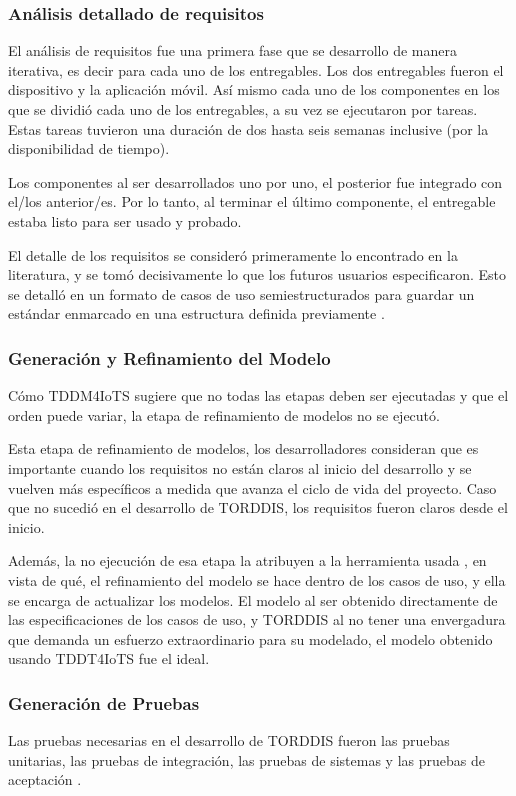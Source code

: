 \subsubsection{Análisis detallado de requisitos}
El análisis de requisitos fue una primera fase que se desarrollo de manera iterativa, es decir para cada uno de los entregables. Los dos entregables fueron el dispositivo y la aplicación móvil. Así mismo cada uno de los componentes en los que se dividió cada uno de los entregables, a su vez se ejecutaron por tareas. Estas tareas tuvieron una duración de dos hasta seis semanas inclusive (por la disponibilidad de tiempo).

Los componentes al ser desarrollados uno por uno, el posterior fue integrado con el/los anterior/es. Por lo tanto, al terminar el último componente, el entregable estaba listo para ser usado y probado.

El detalle de los requisitos se consideró primeramente lo encontrado en la literatura, y se tomó decisivamente lo que los futuros usuarios especificaron. Esto se detalló en un formato de casos de uso semiestructurados para guardar un estándar enmarcado en una estructura definida previamente \citep{Zegzhda2018Use}.

\subsubsection{Generación y Refinamiento del Modelo}
Cómo TDDM4IoTS \citep{Guerrero-Ulloa2020TDDM4IoTS} sugiere que no todas las etapas deben ser ejecutadas y que el orden puede variar, la etapa de refinamiento de modelos no se ejecutó.

Esta etapa de refinamiento de modelos, los desarrolladores consideran que es importante cuando los requisitos no están claros al inicio del desarrollo y se vuelven más específicos a medida que avanza el ciclo de vida del proyecto. Caso que no sucedió en el desarrollo de TORDDIS, los requisitos fueron claros desde el inicio.

Además, la no ejecución de esa etapa la atribuyen a la herramienta usada \citep{Guerrero2024Test}, en vista de qué, el refinamiento del modelo se hace dentro de los casos de uso, y ella se encarga de actualizar los modelos. El modelo al ser obtenido directamente de las especificaciones de los casos de uso, y TORDDIS al no tener una envergadura que demanda un esfuerzo extraordinario para su modelado, el modelo obtenido usando TDDT4IoTS fue el ideal.

\subsubsection{Generación de Pruebas}
Las pruebas necesarias en el desarrollo de TORDDIS fueron las pruebas unitarias, las pruebas de integración, las pruebas de sistemas y las pruebas de aceptación \citep{Sciarra2024Smash}.

